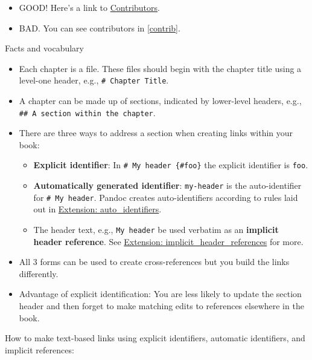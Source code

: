 \documentclass[
]{book}
\providecommand{\tightlist}{%
  \setlength{\itemsep}{0pt}\setlength{\parskip}{0pt}}
\begin{document}
\begin{itemize}
\tightlist
\item
  GOOD! Here's a link to \hyperref[contrib]{Contributors}.
\item
  BAD. You can see contributors in \ref{contrib}.
\end{itemize}

Facts and vocabulary

\begin{itemize}
\tightlist
\item
  Each chapter is a file. These files should begin with the chapter title using a level-one header, e.g., \texttt{\#\ Chapter\ Title}.
\item
  A chapter can be made up of sections, indicated by lower-level headers, e.g., \texttt{\#\#\ A\ section\ within\ the\ chapter}.
\item
  There are three ways to address a section when creating links within your book:

  \begin{itemize}
  \tightlist
  \item
    \textbf{Explicit identifier}: In \texttt{\#\ My\ header\ \{\#foo\}} the explicit identifier is \texttt{foo}.
  \item
    \textbf{Automatically generated identifier}: \texttt{my-header} is the auto-identifier for \texttt{\#\ My\ header}. Pandoc creates auto-identifiers according to rules laid out in \href{http://pandoc.org/README.html\#extension-auto_identifiers}{Extension: auto\_identifiers}.
  \item
    The header text, e.g., \texttt{My\ header} be used verbatim as an \textbf{implicit header reference}. See \href{http://pandoc.org/README.html\#extension-implicit_header_references}{Extension: implicit\_header\_references} for more.
  \end{itemize}
\item
  All 3 forms can be used to create cross-references but you build the links differently.
\item
  Advantage of explicit identification: You are less likely to update the section header and then forget to make matching edits to references elsewhere in the book.
\end{itemize}

How to make text-based links using explicit identifiers, automatic identifiers, and implicit references:
\end{document}
